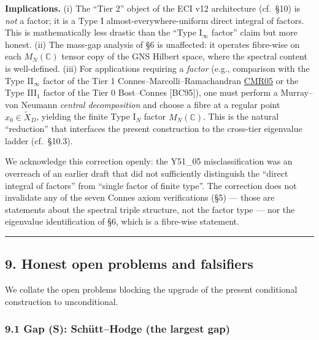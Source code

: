 \documentclass[
  11pt,
  a4paper,
]{amsart}
\begin{document}
\textbf{Implications.} (i) The ``Tier 2'' object of the ECI v12 architecture
(cf.~§10) is \emph{not} a factor; it is a Type I almost-everywhere-uniform direct
integral of factors. This is mathematically less drastic than the ``Type
I\(_\infty\) factor'' claim but more honest. (ii) The mass-gap analysis of §6 is
unaffected: it operates fibre-wise on each \(M_N(\mathbb{C})\) tensor copy of
the GNS Hilbert space, where the spectral content is well-defined. (iii) For
applications requiring a \emph{factor} (e.g., comparison with the Type II\(_\infty\)
factor of the Tier 1 Connes--Marcolli--Ramachandran \href{Connes–Marcolli–Ramachandran\%20BC\%20system\%20for\%20imaginary\%20quadratic}{CMR05} or the Type III\(_1\)
factor of the Tier 0 Bost--Connes {[}BC95{]}), one must perform a Murray--von Neumann
\emph{central decomposition} and choose a fibre at a regular point \(x_0 \in \widetilde{X}_D\),
yielding the finite Type I\(_N\) factor \(M_N(\mathbb{C})\). This is the natural
``reduction'' that interfaces the present construction to the cross-tier
eigenvalue ladder (cf.~§10.3).

We acknowledge this correction openly: the Y51\_05 misclassification was an
overreach of an earlier draft that did not sufficiently distinguish the
``direct integral of factors'' from ``single factor of finite type''. The
correction does not invalidate any of the seven Connes axiom verifications
(§5) --- those are statements about the spectral triple structure, not the
factor type --- nor the eigenvalue identification of §6, which is a
fibre-wise statement.

\begin{center}\rule{0.5\linewidth}{0.5pt}\end{center}

\hypertarget{honest-open-problems-and-falsifiers}{%
\subsection{9. Honest open problems and falsifiers}\label{honest-open-problems-and-falsifiers}}

We collate the open problems blocking the upgrade of the present conditional
construction to unconditional.

\hypertarget{gap-s-schuxfctthodge-the-largest-gap}{%
\subsubsection{9.1 Gap (S): Schütt--Hodge (the largest gap)}\label{gap-s-schuxfctthodge-the-largest-gap}}
\end{document}
